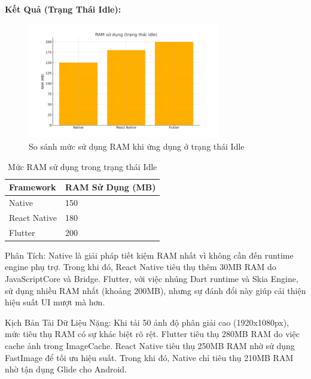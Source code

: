     \vspace{0.5em}
    
    
      \textbf{Kết Quả (Trạng Thái Idle):}
    \vspace{0.5em}
    
    \begin{figure}[H]
        \centering
        \includegraphics[width=0.75\textwidth]{images/idle_memory_usage.png}
        \caption{So sánh mức sử dụng RAM khi ứng dụng ở trạng thái Idle}
    \end{figure}
    
    \vspace{0.5em}
    
    \begin{table}[H]
      \centering
      \begin{tabular}{|p{5cm}|p{7cm}|}
      \hline
      \textbf{Framework} & \textbf{RAM Sử Dụng (MB)} \\
      \hline
      Native       & 150 \\
      React Native & 180 \\
      Flutter      & 200 \\
      \hline
      \end{tabular}
      \caption{Mức RAM sử dụng trong trạng thái Idle}
  \end{table}
  

  
    Phân Tích:
    Native là giải pháp tiết kiệm RAM nhất vì không cần đến runtime engine phụ trợ. Trong khi đó, React Native tiêu thụ thêm 30MB RAM do JavaScriptCore và Bridge. Flutter, với việc nhúng Dart runtime và Skia Engine, sử dụng nhiều RAM nhất (khoảng 200MB), nhưng sự đánh đổi này giúp cải thiện hiệu suất UI mượt mà hơn.
  \vspace{0.5em}
  
    Kịch Bản Tải Dữ Liệu Nặng: Khi tải 50 ảnh độ phân giải cao (1920x1080px), mức tiêu thụ RAM có sự khác biệt rõ rệt. Flutter tiêu thụ 280MB RAM do việc cache ảnh trong ImageCache. React Native tiêu thụ 250MB RAM nhờ sử dụng FastImage để tối ưu hiệu suất. Trong khi đó, Native chỉ tiêu thụ 210MB RAM nhờ tận dụng Glide cho Android.
  \vspace{0.5em}

